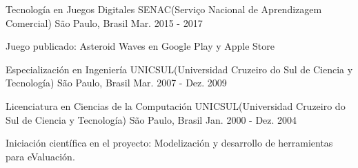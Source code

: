 

\begin{cventries}

  \cventry
    {Tecnología en Juegos Digitales} %
    {SENAC(Serviço Nacional de Aprendizagem Comercial)} %
    {São Paulo, Brasil} %
    {Mar. 2015 - 2017} %
    {
      \begin{cvitems} %
        \item {Juego publicado: Asteroid Waves en Google Play y Apple Store}
      \end{cvitems}
    }

  \cventry
    {Especialización en Ingeniería} %
    {UNICSUL(Universidad Cruzeiro do Sul de Ciencia y Tecnología)} %
    {São Paulo, Brasil} %
    {Mar. 2007 - Dez. 2009} %
    {}

  \cventry
    {Licenciatura en Ciencias de la Computación} %
    {UNICSUL(Universidad Cruzeiro do Sul de Ciencia y Tecnología)} %
    {São Paulo, Brasil} %
    {Jan. 2000 - Dez. 2004} %
    {
      \begin{cvitems} %
        \item {Iniciación científica en el proyecto: Modelización y desarrollo de herramientas para eValuación.}
      \end{cvitems}
    }


\end{cventries}
